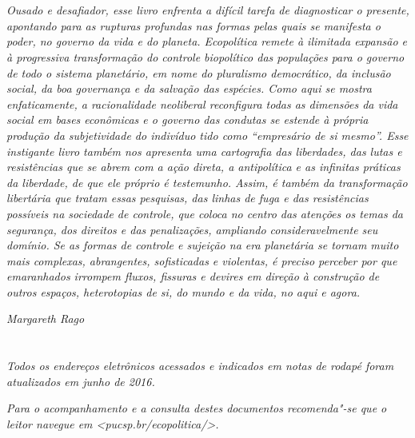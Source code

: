 \chapter*{}

\vspace*{\fill}

\begin{flushright}
\begin{adjustwidth}{2.0cm}{}
\raggedleft\footnotesize\emph{Ousado e desafiador, esse livro enfrenta a difícil tarefa de
diagnosticar o presente, apontando para as rupturas profundas nas formas
pelas quais se manifesta o poder, no governo da vida e do planeta.
\emph{Ecopolítica} remete à ilimitada expansão e à progressiva
transformação do controle biopolítico das populações para o governo de
todo o sistema planetário, em nome do pluralismo democrático, da
inclusão social, da boa governança e da salvação das espécies. Como aqui
se mostra enfaticamente, a racionalidade neoliberal reconfigura todas as
dimensões da vida social em bases econômicas e o governo das condutas se
estende à própria produção da subjetividade do indivíduo tido como
``empresário de si mesmo''. Esse instigante livro também nos apresenta
uma cartografia das liberdades, das lutas e resistências que se abrem
com a ação direta, a antipolítica e as infinitas práticas da liberdade,
de que ele próprio é testemunho. Assim, é também da transformação
libertária que tratam essas pesquisas, das linhas de fuga e das
resistências possíveis na sociedade de controle, que coloca no centro
das atenções os temas da segurança, dos direitos e das penalizações,
ampliando consideravelmente seu domínio. Se as formas de controle e
sujeição na era planetária se tornam muito mais complexas, abrangentes,
sofisticadas e violentas, é preciso perceber por que emaranhados
irrompem fluxos, fissuras e devires em direção à construção de outros
espaços, heterotopias de si, do mundo e da vida, no aqui e agora.}

\medskip

\emph{Margareth Rago}
\end{adjustwidth}
\end{flushright}
\thispagestyle{empty}

\chapter*{}

\vspace{\fill}
\emph{Todos os endereços eletrônicos acessados e indicados em notas de rodapé
foram atualizados em junho de 2016.}

\medskip

\noindent\emph{Para o acompanhamento e a consulta destes documentos recomenda"-se que o
leitor navegue em \textless{}\emph{pucsp.br/ecopolitica/}\textgreater{}.}
\thispagestyle{empty}
